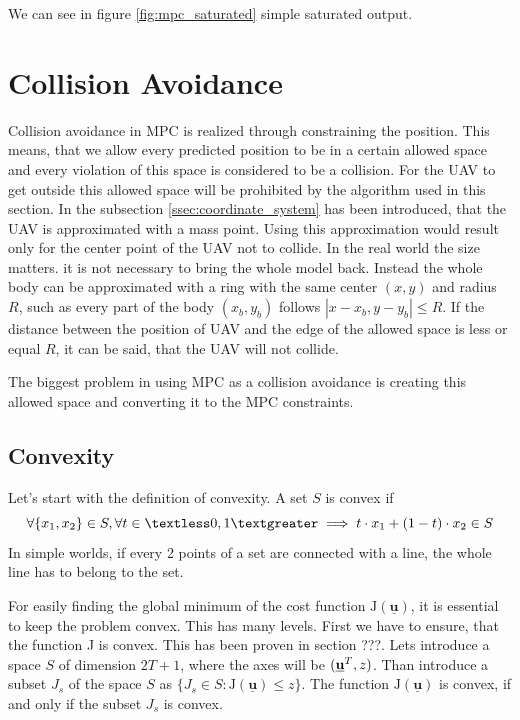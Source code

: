\documentclass{article}
\newcommand{\uvec}{\textbf{\underline{u}}}
\begin{document}
We can see in figure \ref{fig:mpc_saturated} simple saturated output. 

\section{Collision Avoidance}
Collision avoidance in MPC is realized through constraining the position. This means, that we allow every predicted position to be in a certain allowed space and every violation of this space is considered to be a collision. For the UAV to get outside this allowed space will be prohibited by the algorithm used in this section. In the subsection \ref{ssec:coordinate_system} has been introduced, that the UAV is approximated with a mass point. Using this approximation would result only for the center point of the UAV not to collide. In the real world the size matters. it is not necessary to bring the whole model back. Instead the whole body can be approximated with a ring with the same center $(x, y)$ and radius $R$, such as every part of the body $(x_b, y_b)$ follows $|x - x_b, y - y_b| \leq R$. If the distance between the position of UAV and the edge of the allowed space is less or equal $R$, it can be said, that the UAV will not collide. 

The biggest problem in using MPC as a collision avoidance is creating this allowed space and converting it to the MPC constraints. 

\subsection{Convexity}
\label{sec:convexity}
Let's start with the definition of convexity. A set $S$ is convex if
\begin{equation}
\label{eq:convexity_definition}
\forall\{x_1, x_2\} \in S, \forall t \in  \textless 0, 1 \textgreater \implies t \cdot x_1 + (1-t) \cdot x_2 \in S
\end{equation}
In simple worlds, if every 2 points of a set are connected with a line, the whole line has to belong to the set.

For easily finding the global minimum of the cost function $\mathrm{J}(\underline{\textbf{u}})$, it is essential to keep the problem convex. This has many levels. First we have to ensure, that the function J is convex. This has been proven in section ???. Lets introduce a space $S$ of dimension $2T+1$, where the axes will be $(\uvec^T, z)$. Than introduce a subset $J_s$ of the space $S$ as $\{J_s \in S : \mathrm{J}(\underline{\textbf{u}}) \leq z\}$. The function $\mathrm{J}(\underline{\textbf{u}})$ is convex, if and only if the subset $J_s$ is convex. 
\end{document}

